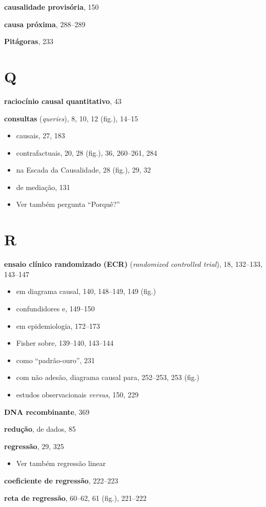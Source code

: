 \documentclass[11pt,a5paper,twoside]{book}
\begin{document}
\textbf{causalidade provisória}, 150

\textbf{causa próxima}, 288–289

\textbf{Pitágoras}, 233

\section{Q}
\textbf{raciocínio causal quantitativo}, 43

\textbf{consultas} (\textit{queries}), 8, 10, 12 (fig.), 14–15

\begin{itemize}
\item causais, 27, 183
\item contrafactuais, 20, 28 (fig.), 36, 260–261, 284
\item na Escada da Causalidade, 28 (fig.), 29, 32
\item de mediação, 131
\item Ver também pergunta “Porquê?”
\end{itemize}
\section{R}
\textbf{ensaio clínico randomizado (ECR)} (\textit{randomized controlled trial}), 18, 132–133, 143–147

\begin{itemize}
\item em diagrama causal, 140, 148–149, 149 (fig.)
\item confundidores e, 149–150
\item em epidemiologia, 172–173
\item Fisher sobre, 139–140, 143–144
\item como “padrão-ouro”, 231
\item com não adesão, diagrama causal para, 252–253, 253 (fig.)
\item estudos observacionais \textit{versus}, 150, 229
\end{itemize}
\textbf{DNA recombinante}, 369

\textbf{redução}, de dados, 85

\textbf{regressão}, 29, 325

\begin{itemize}
\item Ver também regressão linear
\end{itemize}
\textbf{coeficiente de regressão}, 222–223

\textbf{reta de regressão}, 60–62, 61 (fig.), 221–222
\end{document}
